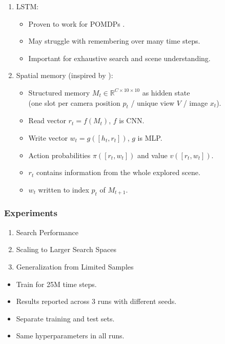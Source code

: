 \begin{frame}
    \begin{enumerate}
        \item LSTM:
        \begin{itemize}
            \item Proven to work for POMDPs \cite{hausknecht_deep_2017,mnih_asynchronous_2016,mirowski_learning_2017,gupta_cognitive_2019}.
            \item May struggle with remembering over many time steps.
            \item Important for exhaustive search and scene understanding.
        \end{itemize}
        \item Spatial memory (inspired by \cite{parisotto_neural_2017}):
        \begin{itemize}
            \item Structured memory \(M_t \in \mathbb{R}^{C \times 10 \times 10}\) as hidden state \\
            (one slot per camera position \(p_t\) / unique view \(V\) / image \(x_t\)).
            \item Read vector \(r_t = f(M_t)\), \(f\) is CNN.
            \item Write vector \(w_t = g(\left\lbrack h_t, r_t \right\rbrack)\), \(g\) is MLP.
            \item Action probabilities \(\pi(\left\lbrack r_t, w_t \right\rbrack)\) and value \(v(\left\lbrack r_t, w_t \right\rbrack)\).
            \item \(r_t\) contains information from the whole explored scene.
            \item \(w_t\) written to index \(p_t\) of \(M_{t+1}\).
        \end{itemize}
    \end{enumerate}
\end{frame}

\begin{frame}
    \frametitle{Experiments}

    \begin{enumerate}
        \item Search Performance
        \item Scaling to Larger Search Spaces
        \item Generalization from Limited Samples
    \end{enumerate}

    \begin{itemize}
        \item Train for 25M time steps.
        \item Results reported across 3 runs with different seeds.
        \item Separate training and test sets.
        \item Same hyperparameters in all runs.
    \end{itemize}
\end{frame}


